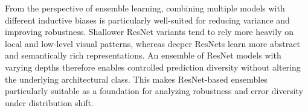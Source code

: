 From the perspective of ensemble learning, combining multiple models with different inductive biases is particularly well-suited for reducing variance and improving robustness. 
Shallower ResNet variants tend to rely more heavily on local and low-level visual patterns, whereas deeper ResNets learn more abstract and semantically rich representations. 
An ensemble of ResNet models with varying depths therefore enables controlled prediction diversity without altering the underlying architectural class. 
This makes ResNet-based ensembles particularly suitable as a foundation for analyzing robustness and error diversity under distribution shift.